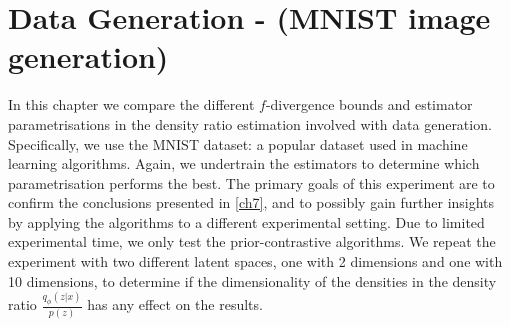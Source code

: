 \documentclass[honours,12pt]{unswthesis}
\numberwithin{equation}{section}
\theoremstyle{definition}
\begin{document}
\chapter{Data Generation - (MNIST image generation)}\label{ch8}
In this chapter we compare the different $f$-divergence bounds and estimator parametrisations in the density ratio estimation involved with data generation. Specifically, we use the MNIST dataset: a popular dataset used in machine learning algorithms. Again, we undertrain the estimators to determine which parametrisation performs the best. The primary goals of this experiment are to confirm the conclusions presented in \autoref{ch7}, and to possibly gain further insights by applying the algorithms to a different experimental setting. Due to limited experimental time, we only test the prior-contrastive algorithms. We repeat the experiment with two different latent spaces, one with 2 dimensions and one with 10 dimensions, to determine if the dimensionality of the densities in the density ratio $\frac{q_\phi(z|x)}{p(z)}$ has any effect on the results.
\end{document}
